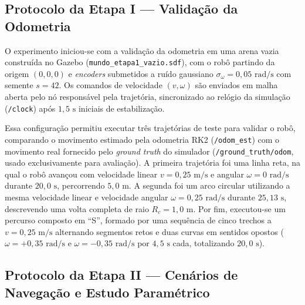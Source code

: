 

\subsection{Protocolo da Etapa I --- Validação da Odometria}

O experimento iniciou-se com a validação da odometria em uma arena vazia construída no Gazebo (\texttt{mundo\_\allowbreak etapa1\_\allowbreak vazio.sdf}), com o robô partindo da origem $(0, 0, 0)$ e \textit{encoders} submetidos a ruído gaussiano $\sigma_\omega = 0{,}05\text{ rad/s}$ com semente $s = 42$. Os comandos de velocidade $(v, \omega)$ são enviados em malha aberta pelo nó responsável pela trajetória, sincronizado ao relógio da simulação (\texttt{/clock}) após $1{,}5\text{ s}$ iniciais de estabilização.

Essa configuração permitiu executar três trajetórias de teste para validar o robô, comparando o movimento estimado pela odometria RK2 (\texttt{/odom\_est}) com o movimento real fornecido pelo \textit{ground truth} do simulador (\texttt{/ground\_truth/odom}, usado exclusivamente para avaliação). A primeira trajetória foi uma linha reta, na qual o robô avançou com velocidade linear $v = 0{,}25\text{ m/s}$ e angular $\omega = 0\text{ rad/s}$ durante $20{,}0\text{ s}$, percorrendo $5{,}0\text{ m}$. A segunda foi um arco circular utilizando a mesma velocidade linear e velocidade angular $\omega = 0{,}25\text{ rad/s}$ durante $25{,}13\text{ s}$, descrevendo uma volta completa de raio $R_c = 1{,}0\text{ m}$. Por fim, executou-se um percurso composto em ``S'', formado por uma sequência de cinco trechos a $v = 0{,}25\text{ m/s}$ alternando segmentos retos e duas curvas em sentidos opostos ($\omega = +0{,}35\text{ rad/s}$ e $\omega = -0{,}35\text{ rad/s}$ por $4{,}5\text{ s}$ cada, totalizando $20{,}0\text{ s}$).

\subsection{Protocolo da Etapa II --- Cenários de Navegação e Estudo Paramétrico}

